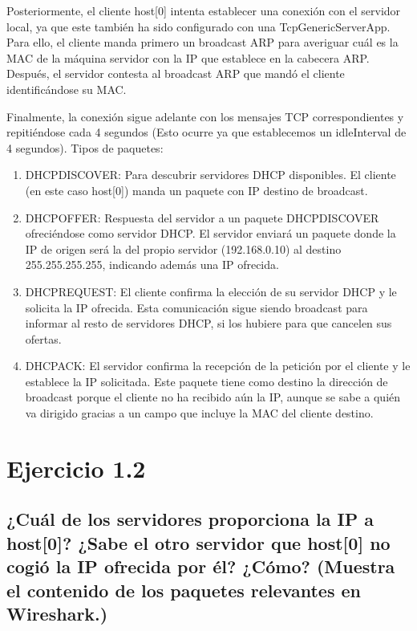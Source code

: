 Posteriormente, el cliente host[0] intenta establecer una conexión con el servidor local, ya que este también ha sido configurado con una TcpGenericServerApp. Para ello, el cliente manda primero un broadcast ARP para averiguar cuál es la MAC de la máquina servidor con la IP que establece en la cabecera ARP. Después, el servidor contesta al broadcast ARP que mandó el cliente identificándose su MAC.

Finalmente, la conexión sigue adelante con los mensajes TCP correspondientes y repitiéndose cada 4 segundos (Esto ocurre ya que establecemos un idleInterval de 4 segundos).
\newline
\newline
Tipos de paquetes:
\begin{enumerate}
    \item DHCPDISCOVER: Para descubrir servidores DHCP disponibles. El cliente (en este caso host[0]) manda un paquete con IP destino de broadcast.
    \item DHCPOFFER: Respuesta del servidor a un paquete DHCPDISCOVER ofreciéndose como servidor DHCP. El servidor enviará un paquete donde la IP de origen será la del propio servidor (192.168.0.10) al destino 255.255.255.255, indicando además una IP ofrecida.
    \item DHCPREQUEST: El cliente confirma la elección de su servidor DHCP y le solicita la IP ofrecida. Esta comunicación sigue siendo broadcast para informar al resto de servidores DHCP, si los hubiere para que cancelen sus ofertas.
    \item DHCPACK: El servidor confirma la recepción de la petición por el cliente y le establece la IP solicitada. Este paquete tiene como destino la dirección de broadcast porque el cliente no ha recibido aún la IP, aunque se sabe a quién va dirigido gracias a un campo que incluye la MAC del cliente destino.
\end{enumerate}

\newpage

\section{Ejercicio 1.2}
\label{sec:ej12}
\subsection{¿Cuál de los servidores proporciona la IP a host[0]? ¿Sabe el otro servidor que host[0] no cogió la IP ofrecida por él? ¿Cómo? (Muestra el contenido de los paquetes relevantes en Wireshark.)}

